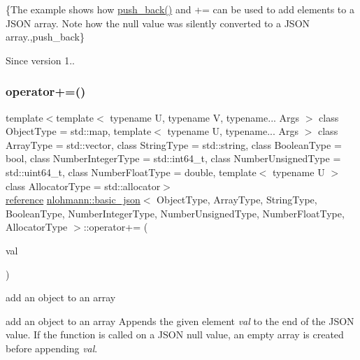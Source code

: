 \{The example shows how {\ttfamily \hyperlink{classnlohmann_1_1basic__json_a486b96adbf4886c38e38c952394a220f}{push\+\_\+back()}} and {\ttfamily +=} can be used to add elements to a J\+S\+ON array. Note how the {\ttfamily null} value was silently converted to a J\+S\+ON array.,push\+\_\+back\}

\begin{DoxySince}{Since}
version 1.. 
\end{DoxySince}
\hypertarget{classnlohmann_1_1basic__json_a80c21170db6b5ffd9274b3f351cebadc}{}\label{classnlohmann_1_1basic__json_a80c21170db6b5ffd9274b3f351cebadc} 
\subsubsection{\texorpdfstring{operator+=()}{operator+=()}\hspace{0.1cm}{\footnotesize\ttfamily [2/4]}}
{\footnotesize\ttfamily template$<$template$<$ typename U, typename V, typename... Args $>$ class Object\+Type = std\+::map, template$<$ typename U, typename... Args $>$ class Array\+Type = std\+::vector, class String\+Type  = std\+::string, class Boolean\+Type  = bool, class Number\+Integer\+Type  = std\+::int64\+\_\+t, class Number\+Unsigned\+Type  = std\+::uint64\+\_\+t, class Number\+Float\+Type  = double, template$<$ typename U $>$ class Allocator\+Type = std\+::allocator$>$ \\
\hyperlink{classnlohmann_1_1basic__json_a3ec8e17be8732fe436e9d6733f52b7a3}{reference} \hyperlink{classnlohmann_1_1basic__json}{nlohmann\+::basic\+\_\+json}$<$ Object\+Type, Array\+Type, String\+Type, Boolean\+Type, Number\+Integer\+Type, Number\+Unsigned\+Type, Number\+Float\+Type, Allocator\+Type $>$\+::operator+= (\begin{DoxyParamCaption}\item[{const \hyperlink{classnlohmann_1_1basic__json}{basic\+\_\+json}$<$ Object\+Type, Array\+Type, String\+Type, Boolean\+Type, Number\+Integer\+Type, Number\+Unsigned\+Type, Number\+Float\+Type, Allocator\+Type $>$ \&}]{val }\end{DoxyParamCaption})\hspace{0.3cm}{\ttfamily [inline]}}



add an object to an array 

add an object to an array Appends the given element {\itshape val} to the end of the J\+S\+ON value. If the function is called on a J\+S\+ON null value, an empty array is created before appending {\itshape val}.


